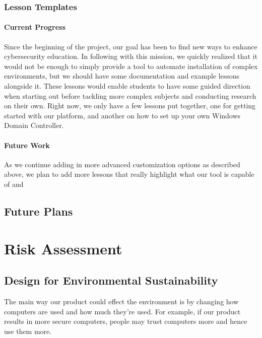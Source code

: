 \documentclass[openright]{report}
\begin{document}
\subsection{Lesson Templates}

\subsubsection{Current Progress}
Since the beginning of the project, our goal has been to find new ways to enhance cybersecurity education. In following with this mission, we quickly realized that it would not be enough to simply provide a tool to automate installation of complex environments, but we should have some documentation and example lessons alongside it. These lessons would enable students to have some guided direction when starting out before tackling more complex subjects and conducting research on their own. Right now, we only have a few lessons put together, one for getting started with our platform, and another on how to set up your own Windows Domain Controller.

\subsubsection{Future Work}
As we continue adding in more advanced customization options as described above, we plan to add more lessons that really highlight what our tool is capable of and 

\section{Future Plans}

\chapter{Risk Assessment}

\section{Design for Environmental Sustainability}

\par The main way our product could effect the environment is by changing how computers are used and how much they're used. For example, if our product results in more secure computers, people may trust computers more and hence use them more. 
\end{document}
